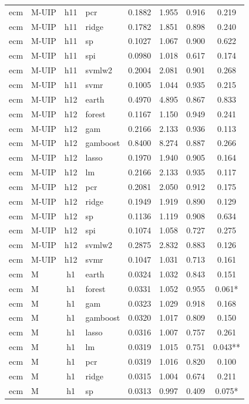 \begin{ThreePartTable}
\begin{longtable}[t]{llclcccc}
ecm & M-UIP & h11 & pcr & 0.1882 & 1.955 & 0.916 & 0.219\\
ecm & M-UIP & h11 & ridge & 0.1782 & 1.851 & 0.898 & 0.240\\
ecm & M-UIP & h11 & sp & 0.1027 & 1.067 & 0.900 & 0.622\\
ecm & M-UIP & h11 & spi & 0.0980 & 1.018 & 0.617 & 0.174\\
ecm & M-UIP & h11 & svmlw2 & 0.2004 & 2.081 & 0.901 & 0.268\\
ecm & M-UIP & h11 & svmr & 0.1005 & 1.044 & 0.935 & 0.215\\
\addlinespace
ecm & M-UIP & h12 & earth & 0.4970 & 4.895 & 0.867 & 0.833\\
ecm & M-UIP & h12 & forest & 0.1167 & 1.150 & 0.949 & 0.241\\
ecm & M-UIP & h12 & gam & 0.2166 & 2.133 & 0.936 & 0.113\\
ecm & M-UIP & h12 & gamboost & 0.8400 & 8.274 & 0.887 & 0.266\\
ecm & M-UIP & h12 & lasso & 0.1970 & 1.940 & 0.905 & 0.164\\
ecm & M-UIP & h12 & lm & 0.2166 & 2.133 & 0.935 & 0.117\\
ecm & M-UIP & h12 & pcr & 0.2081 & 2.050 & 0.912 & 0.175\\
ecm & M-UIP & h12 & ridge & 0.1949 & 1.919 & 0.890 & 0.129\\
ecm & M-UIP & h12 & sp & 0.1136 & 1.119 & 0.908 & 0.634\\
ecm & M-UIP & h12 & spi & 0.1074 & 1.058 & 0.727 & 0.275\\
ecm & M-UIP & h12 & svmlw2 & 0.2875 & 2.832 & 0.883 & 0.126\\
ecm & M-UIP & h12 & svmr & 0.1047 & 1.031 & 0.713 & 0.161\\
\addlinespace
ecm & M & h1 & earth & 0.0324 & 1.032 & 0.843 & 0.151\\
ecm & M & h1 & forest & 0.0331 & 1.052 & 0.955 & 0.061*\\
ecm & M & h1 & gam & 0.0323 & 1.029 & 0.918 & 0.168\\
ecm & M & h1 & gamboost & 0.0320 & 1.017 & 0.809 & 0.150\\
ecm & M & h1 & lasso & 0.0316 & 1.007 & 0.757 & 0.261\\
ecm & M & h1 & lm & 0.0319 & 1.015 & 0.751 & 0.043**\\
ecm & M & h1 & pcr & 0.0319 & 1.016 & 0.820 & 0.100\\
ecm & M & h1 & ridge & 0.0315 & 1.004 & 0.674 & 0.211\\
ecm & M & h1 & sp & 0.0313 & 0.997 & 0.409 & 0.075*\\

\end{longtable}
\end{ThreePartTable}
